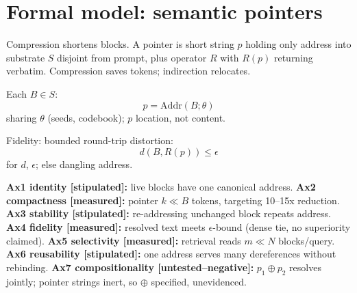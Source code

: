 \section{Formal model: semantic pointers}
\label{sec:formal}
Compression shortens blocks. A pointer is short string $p$ holding only address into substrate $S$ disjoint from prompt, plus operator $R$ with $R(p)$ returning verbatim. Compression saves tokens; indirection relocates.

Each $B \in S$:
\[
p = \mathrm{Addr}(B; \theta)
\]
sharing $\theta$ (seeds, codebook); $p$ location, not content.

Fidelity: bounded round-trip distortion:
\[
d(B, R(p)) \le \epsilon
\]
for $d$, $\epsilon$; else dangling address.

\textbf{Ax1 identity [stipulated]:} live blocks have one canonical address. \textbf{Ax2 compactness [measured]:} pointer $k \ll B$ tokens, targeting 10--15x reduction. \textbf{Ax3 stability [stipulated]:} re-addressing unchanged block repeats address. \textbf{Ax4 fidelity [measured]:} resolved text meets $\epsilon$-bound (dense tie, no superiority claimed). \textbf{Ax5 selectivity [measured]:} retrieval reads $m \ll N$ blocks/query. \textbf{Ax6 reusability [stipulated]:} one address serves many dereferences without rebinding. \textbf{Ax7 compositionality [untested--negative]:} $p_1 \oplus p_2$ resolves jointly; pointer strings inert, so $\oplus$ specified, unevidenced.
